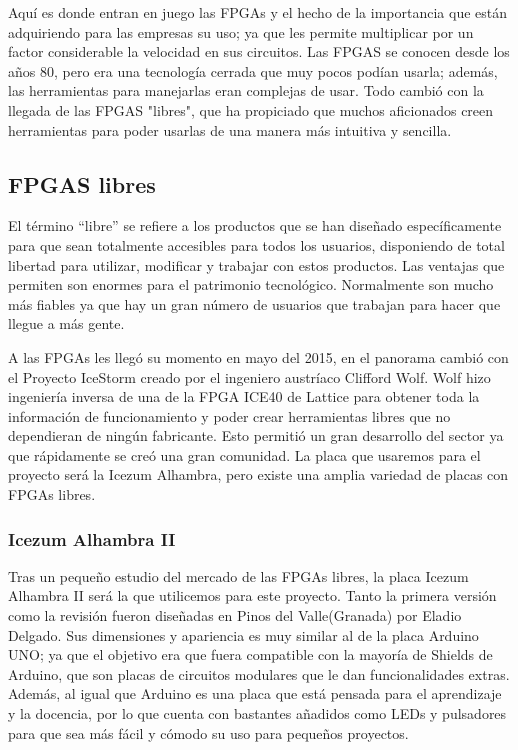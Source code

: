 Aquí es donde entran en juego las FPGAs y el hecho de la importancia que están adquiriendo para las empresas su uso; ya que les permite multiplicar por un factor considerable la velocidad en sus circuitos. Las FPGAS se conocen desde los años 80, pero era una tecnología cerrada que muy pocos podían usarla; además, las herramientas para manejarlas eran complejas de usar. Todo cambió con la llegada de las FPGAS "libres", que ha propiciado que muchos aficionados creen herramientas para poder usarlas de una manera más intuitiva y sencilla. \newline

\subsection{FPGAS libres}

El término “libre” se refiere a los productos que se han diseñado específicamente para que sean totalmente accesibles para todos los usuarios, disponiendo de total libertad para utilizar, modificar y trabajar con estos productos. 
Las ventajas que permiten son enormes para el patrimonio tecnológico. Normalmente son mucho más fiables ya que hay un gran número de usuarios que trabajan para hacer que llegue a más gente. \newline

A las FPGAs les llegó su momento en mayo del 2015, en el panorama cambió con el Proyecto IceStorm creado por el ingeniero austríaco Clifford Wolf. Wolf hizo ingeniería inversa de una de la FPGA ICE40 de Lattice para obtener toda la información de funcionamiento y poder crear herramientas libres que no dependieran de ningún fabricante. Esto permitió un gran desarrollo del sector ya que rápidamente se creó una gran comunidad.
La placa que usaremos para el proyecto será la Icezum Alhambra, pero existe una amplia variedad de placas con FPGAs libres.

\subsubsection{Icezum Alhambra II}

Tras un pequeño estudio del mercado de las FPGAs libres, la placa Icezum Alhambra II será la que utilicemos para este proyecto. Tanto la primera versión como la revisión fueron diseñadas en Pinos del Valle(Granada) por Eladio Delgado. Sus dimensiones y apariencia es muy similar al de la placa Arduino UNO; ya que el objetivo era que fuera compatible con la mayoría de Shields de Arduino, que son placas de circuitos modulares que le dan funcionalidades extras. Además, al igual que Arduino es una placa que está pensada para el aprendizaje y la docencia, por lo que cuenta con bastantes añadidos como LEDs y pulsadores para que sea más fácil y cómodo su uso para pequeños proyectos.

